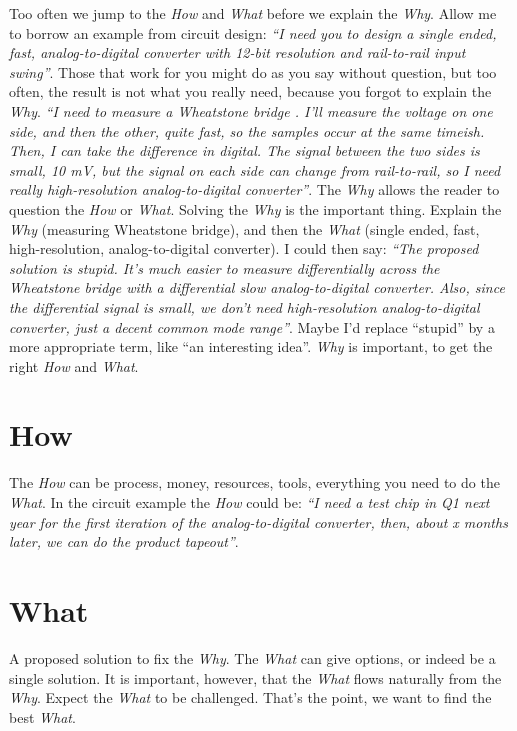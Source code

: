 \documentclass[technote,10pt,a4paper]{IEEEtran}
\begin{document}
Too often we jump to the \textit{How} and \textit{What} before we explain the
\textit{Why}.
Allow me to borrow an example from circuit design:
\textit{``I need you to design a single ended, fast, analog-to-digital converter with
12-bit resolution and rail-to-rail input swing''}. Those that work for you might do as you say without question, but too often, the result is not what you really need, because you forgot to explain the \textit{Why}.
\textit{``I need to measure a Wheatstone bridge \cite{wheat}. I'll measure
  the voltage on one side, and then the other, quite fast, so the samples occur
  at the same timeish. Then, I can take the difference in digital.  The signal
  between the two sides is small, 10 mV, but the signal on each side can change
  from rail-to-rail, so I need really
  high-resolution analog-to-digital converter''}.
The \textit{Why} allows the reader to question the \textit{How} or
\textit{What}. Solving the \textit{Why} is the important thing. Explain the
\textit{Why} (measuring Wheatstone bridge), and then the \textit{What} (single
ended, fast, high-resolution, analog-to-digital converter). I could then say:
\textit{``The proposed solution is stupid. It's much easier to measure differentially
across the Wheatstone bridge with a differential slow analog-to-digital
converter. Also, since the differential signal is small, we don't need
high-resolution analog-to-digital converter, just a decent common mode range''}.
Maybe I'd replace “stupid” by a more appropriate term, like ``an
interesting idea''. \textit{Why} is important, to get the right \textit{How} and \textit{What}.


\section{How}
The \textit{How} can be process, money, resources, tools, everything you need to do the \textit{What}. In the circuit example the \textit{How} could be:
\textit{``I need a test chip in Q1 next year for the first iteration of the
  analog-to-digital converter, then, about x months later, we can do the product tapeout''}.

\section{What}
A proposed solution to fix the \textit{Why}. The \textit{What} can give options,
or indeed be a single solution. It is important, however, that the \textit{What}
flows naturally from the \textit{Why}.
Expect the \textit{What} to be challenged. That's the point, we
want to find the best \textit{What}.
\end{document}
